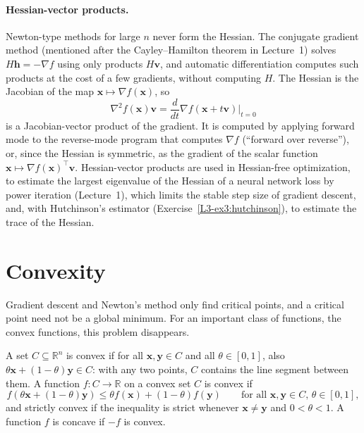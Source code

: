\paragraph{Hessian-vector products.} Newton-type methods for large $n$ never form the Hessian. The conjugate gradient method (mentioned after the Cayley--Hamilton theorem in Lecture~1) solves $H\mathbf{h} = -\nabla f$ using only products $H\mathbf{v}$, and automatic differentiation computes such products at the cost of a few gradients, without computing $H$. The Hessian is the Jacobian of the map $\mathbf{x} \mapsto \nabla f(\mathbf{x})$, so
\[\nabla^2 f(\mathbf{x})\mathbf{v} = \frac{d}{dt}\nabla f(\mathbf{x} + t\mathbf{v})\Big|_{t=0}\]
is a Jacobian-vector product of the gradient. It is computed by applying forward mode to the reverse-mode program that computes $\nabla f$ (``forward over reverse''), or, since the Hessian is symmetric, as the gradient of the scalar function $\mathbf{x} \mapsto \nabla f(\mathbf{x})^\top\mathbf{v}$. Hessian-vector products are used in Hessian-free optimization, to estimate the largest eigenvalue of the Hessian of a neural network loss by power iteration (Lecture~1), which limits the stable step size of gradient descent, and, with Hutchinson's estimator (Exercise~\ref{L3-ex3:hutchinson}), to estimate the trace of the Hessian.

\section{Convexity}\label{L3-sec:convexity}

Gradient descent and Newton's method only find critical points, and a critical point need not be a global minimum. For an important class of functions, the convex functions, this problem disappears.

\begin{definition}\label{L3-def:convex}
    A set $C \subseteq \mathbb{R}^n$ is convex if for all $\mathbf{x}, \mathbf{y} \in C$ and all $\theta \in [0, 1]$, also $\theta\mathbf{x} + (1 - \theta)\mathbf{y} \in C$: with any two points, $C$ contains the line segment between them. A function $f: C \to \mathbb{R}$ on a convex set $C$ is convex if
    \[f(\theta\mathbf{x} + (1 - \theta)\mathbf{y}) \leq \theta f(\mathbf{x}) + (1 - \theta)f(\mathbf{y}) \qquad \text{for all } \mathbf{x}, \mathbf{y} \in C, \, \theta \in [0, 1],\]
    and strictly convex if the inequality is strict whenever $\mathbf{x} \neq \mathbf{y}$ and $0 < \theta < 1$. A function $f$ is concave if $-f$ is convex.
\end{definition}

